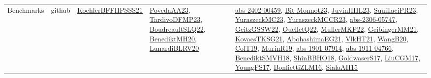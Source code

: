 {\begin{longtable}{llp{6cm}p{6cm}p{6cm}}
Benchmarks & github & \href{articles/KoehlerBFFHPSSS21.pdf}{KoehlerBFFHPSSS21}\cite{KoehlerBFFHPSSS21} & \href{papers/PovedaAA23.pdf}{PovedaAA23}\cite{PovedaAA23}, \href{papers/TardivoDFMP23.pdf}{TardivoDFMP23}\cite{TardivoDFMP23}, \href{papers/BoudreaultSLQ22.pdf}{BoudreaultSLQ22}\cite{BoudreaultSLQ22}, \href{articles/BenediktMH20.pdf}{BenediktMH20}\cite{BenediktMH20}, \href{articles/LunardiBLRV20.pdf}{LunardiBLRV20}\cite{LunardiBLRV20} & \href{articles/abs-2402-00459.pdf}{abs-2402-00459}\cite{abs-2402-00459}, \href{papers/Bit-Monnot23.pdf}{Bit-Monnot23}\cite{Bit-Monnot23}, \href{papers/JuvinHHL23.pdf}{JuvinHHL23}\cite{JuvinHHL23}, \href{papers/SquillaciPR23.pdf}{SquillaciPR23}\cite{SquillaciPR23}, \href{papers/YuraszeckMC23.pdf}{YuraszeckMC23}\cite{YuraszeckMC23}, \href{articles/YuraszeckMCCR23.pdf}{YuraszeckMCCR23}\cite{YuraszeckMCCR23}, \href{articles/abs-2306-05747.pdf}{abs-2306-05747}\cite{abs-2306-05747}, \href{papers/GeitzGSSW22.pdf}{GeitzGSSW22}\cite{GeitzGSSW22}, \href{papers/OuelletQ22.pdf}{OuelletQ22}\cite{OuelletQ22}, \href{articles/MullerMKP22.pdf}{MullerMKP22}\cite{MullerMKP22}, \href{papers/GeibingerMM21.pdf}{GeibingerMM21}\cite{GeibingerMM21}, \href{papers/KovacsTKSG21.pdf}{KovacsTKSG21}\cite{KovacsTKSG21}, \href{articles/AbohashimaEG21.pdf}{AbohashimaEG21}\cite{AbohashimaEG21}, \href{articles/VlkHT21.pdf}{VlkHT21}\cite{VlkHT21}, \href{papers/WangB20.pdf}{WangB20}\cite{WangB20}, \href{papers/ColT19.pdf}{ColT19}\cite{ColT19}, \href{papers/MurinR19.pdf}{MurinR19}\cite{MurinR19}, \href{articles/abs-1901-07914.pdf}{abs-1901-07914}\cite{abs-1901-07914}, \href{articles/abs-1911-04766.pdf}{abs-1911-04766}\cite{abs-1911-04766}, \href{papers/BenediktSMVH18.pdf}{BenediktSMVH18}\cite{BenediktSMVH18}, \href{articles/ShinBBHO18.pdf}{ShinBBHO18}\cite{ShinBBHO18}, \href{papers/GoldwaserS17.pdf}{GoldwaserS17}\cite{GoldwaserS17}, \href{papers/LiuCGM17.pdf}{LiuCGM17}\cite{LiuCGM17}, \href{papers/YoungFS17.pdf}{YoungFS17}\cite{YoungFS17}, \href{papers/BonfiettiZLM16.pdf}{BonfiettiZLM16}\cite{BonfiettiZLM16}, \href{papers/SialaAH15.pdf}{SialaAH15}\cite{SialaAH15}\\

\end{longtable}}
